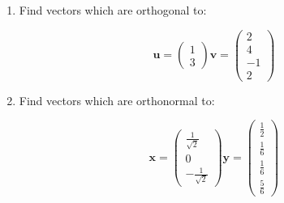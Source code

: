 \documentclass{article}
\begin{document}
\begin{enumerate}
\item Find vectors which are orthogonal to:


\begin{displaymath}
\boldsymbol{u} =  \left( \begin{array}{r} 1 \\ 3 \end{array} \right)
\boldsymbol{v} = \left( \begin{array}{r} 2 \\ 4 \\ -1 \\ 2 \end{array} \right)
\end{displaymath}


\item Find vectors which are orthonormal to:


\begin{displaymath}
\boldsymbol{x} =  \left( \begin{array}{r} \frac{1}{\sqrt{2}} \\ 0 \\ -\frac{1}{\sqrt{2}} \end{array} \right)
\boldsymbol{y} = \left( \begin{array}{r} \frac{1}{2} \\ \frac{1}{6} \\ \frac{1}{6} \\ \frac{5}{6} \end{array} \right)
\end{displaymath}


\end{enumerate}
\end{document}
